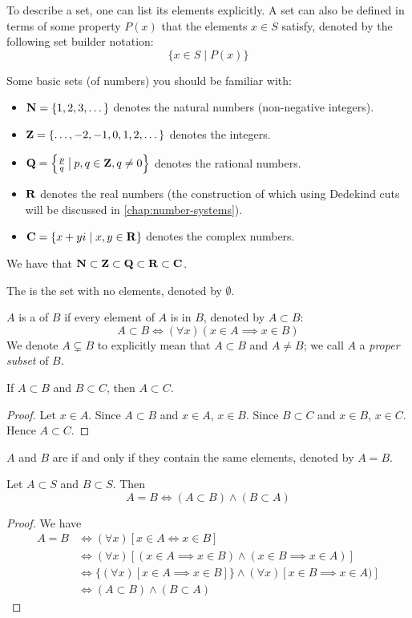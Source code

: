 To describe a set, one can list its elements explicitly. A set can also be defined in terms of some property $P(x)$ that the elements $x \in S$ satisfy, denoted by the following set builder notation:
\[\{x\in S \mid P(x)\}\]

Some basic sets (of numbers) you should be familiar with:
\begin{itemize}
\item $\mathbf N=\{1,2,3,\dots\}$ denotes the natural numbers (non-negative integers).
\item $\mathbf Z=\{\dots,-2,-1,0,1,2,\dots\}$ denotes the integers.
\item $\mathbf Q=\left\{\frac{p}{q}\:\big|\:p,q\in\mathbf Z, q\neq0\right\}$ denotes the rational numbers.
\item $\mathbf R$ denotes the real numbers (the construction of which using Dedekind cuts will be discussed in \cref{chap:number-systems}).
\item $\mathbf C=\{x+yi \mid x,y\in\mathbf R\}$ denotes the complex numbers.
\end{itemize}

We have that $\mathbf N\subset\mathbf Z\subset\mathbf Q\subset\mathbf R\subset\mathbf C$.

The  is the set with no elements, denoted by $\emptyset$.

$A$ is a  of $B$ if every element of $A$ is in $B$, denoted by $A\subset B$:
\[A\subset B\iff(\forall x)(x\in A \implies x\in B)\]
We denote $A\subsetneq B$ to explicitly mean that $A\subset B$ and $A\neq B$; we call $A$ a \emph{proper subset} of $B$.

\begin{proposition}
If $A \subset B$ and $B \subset C$, then $A \subset C$.
\end{proposition}

\begin{proof}
Let $x\in A$. 
Since $A \subset B$ and $x\in A$, $x\in B$. 
Since $B \subset C$ and $x\in B$, $x\in C$. 
Hence $A \subset C$.
\end{proof}

$A$ and $B$ are  if and only if they contain the same elements, denoted by $A=B$. 

\begin{proposition}
Let $A\subset S$ and $B\subset S$. Then
\[A=B\iff (A\subset B)\land(B\subset A)\]
\end{proposition}

\begin{proof}
We have 
\begin{align*}
A = B &\iff (\forall x)[x \in A \iff x \in B] \\
&\iff (\forall x)[(x \in A \implies x \in B) \land (x \in B \implies x \in A)] \\
&\iff \{(\forall x)[x \in A \implies x \in B]\} \land {(\forall x)[x \in B \implies x \in A)]} \\
&\iff (A \subset B) \land (B \subset A)
\end{align*}
\end{proof}

